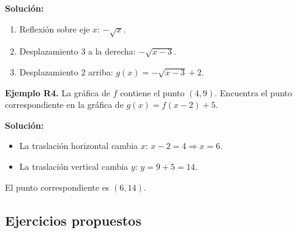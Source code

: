 \documentclass[12pt, letterpaper]{article}
\begin{document}
\begin{cuadrosolucion}
  \textbf{Solución:}
  \begin{enumerate}
    \item Reflexión sobre eje $x$: $-\sqrt{x}$.
    \item Desplazamiento 3 a la derecha: $-\sqrt{x - 3}$.
    \item Desplazamiento 2 arriba: $g(x) = -\sqrt{x - 3} + 2$.
  \end{enumerate}
\end{cuadrosolucion}

\textbf{Ejemplo R4.} La gráfica de $f$ contiene el punto $(4, 9)$. Encuentra el punto correspondiente en la gráfica de $g(x) = f(x - 2) + 5$.

\begin{cuadrosolucion}
  \textbf{Solución:}
  \begin{itemize}
    \item La traslación horizontal cambia $x$: $x - 2 = 4 \Rightarrow x = 6$.
    \item La traslación vertical cambia $y$: $y = 9 + 5 = 14$.
  \end{itemize}
  El punto correspondiente es $(6, 14)$.
\end{cuadrosolucion}

\subsection{Ejercicios propuestos}
\end{document}
